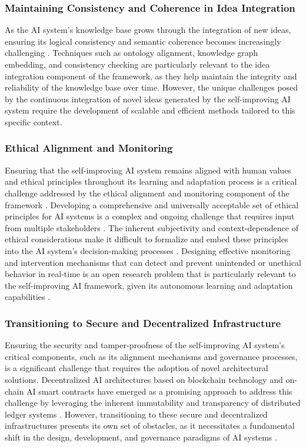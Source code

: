 \documentclass[conference]{article}
\begin{document}
	\subsubsection{Maintaining Consistency and Coherence in Idea Integration}
	As the AI system's knowledge base grows through the integration of new ideas, ensuring its logical consistency and semantic coherence becomes increasingly challenging \cite{ji2021survey}. Techniques such as ontology alignment, knowledge graph embedding, and consistency checking are particularly relevant to the idea integration component of the framework, as they help maintain the integrity and reliability of the knowledge base over time. However, the unique challenges posed by the continuous integration of novel ideas generated by the self-improving AI system require the development of scalable and efficient methods tailored to this specific context.
	
	\subsubsection{Ethical Alignment and Monitoring}
	Ensuring that the self-improving AI system remains aligned with human values and ethical principles throughout its learning and adaptation process is a critical challenge addressed by the ethical alignment and monitoring component of the framework \cite{russell2019human}. Developing a comprehensive and universally acceptable set of ethical principles for AI systems is a complex and ongoing challenge that requires input from multiple stakeholders \cite{cath2018governing}. The inherent subjectivity and context-dependence of ethical considerations make it difficult to formalize and embed these principles into the AI system's decision-making processes \cite{wallach2008moral}. Designing effective monitoring and intervention mechanisms that can detect and prevent unintended or unethical behavior in real-time is an open research problem that is particularly relevant to the self-improving AI framework, given its autonomous learning and adaptation capabilities \cite{everitt2018scalable}.
	
	\subsubsection{Transitioning to Secure and Decentralized Infrastructure}
	Ensuring the security and tamper-proofness of the self-improving AI system's critical components, such as its alignment mechanisms and governance processes, is a significant challenge that requires the adoption of novel architectural solutions. Decentralized AI architectures based on blockchain technology and on-chain AI smart contracts have emerged as a promising approach to address this challenge by leveraging the inherent immutability and transparency of distributed ledger systems \cite{arutyunyan2023decentralized}. However, transitioning to these secure and decentralized infrastructures presents its own set of obstacles, as it necessitates a fundamental shift in the design, development, and governance paradigms of AI systems \cite{harris2019decentralized}.
		
\end{document}
